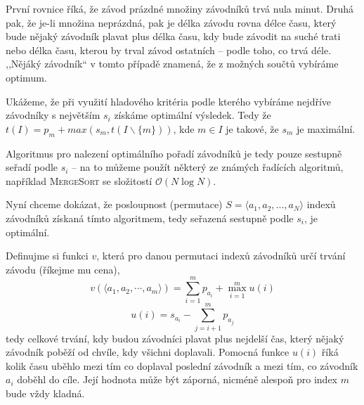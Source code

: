 \documentclass[12pt]{article}
\newcommand{\la}{\leftarrow}
\renewcommand{\O}{\mathcal{O}}
\begin{document}
První rovnice říká, že závod prázdné množiny závodníků trvá nula minut. Druhá pak, že je-li množina
neprázdná, pak je délka závodu rovna délce času, který bude nějaký závodník plavat plus délka času,
kdy bude závodit na suché trati nebo délka času, kterou by trval závod ostatních -- podle
toho, co trvá déle. ,,Nějáký závodník`` v tomto případě znamená, že z možných součtů vybíráme
optimum.

Ukážeme, že při využití hladového kritéria podle kterého vybíráme nejdříve závodníky s největším
$s_i$ získáme optimální výsledek. Tedy že $t(I) = p_m + max(s_m, t(I \smallsetminus \{m\}))$, kde $m
\in I$ je takové, že $s_m$ je maximální.

Algoritmus pro nalezení optimálního pořadí závodníků je tedy pouze sestupně seřadí podle $s_i$ -- na
to můžeme použít některý ze známých řadících algoritmů, například \textsc{MergeSort} se složitostí
$\O(N\log N)$.

%
%

\bigskip

\noindent
Nyní chceme dokázat, že posloupnost (permutace) $S = \langle a_1,a_2,...,a_N \rangle$ indexů
závodníků získaná tímto algoritmem, tedy seřazená sestupně podle $s_i$, je optimální.

Definujme si funkci $v$, která pro danou permutaci indexů závodníků určí trvání závodu (říkejme mu cena),
$$ v(\langle a_1,a_2,\cdots,a_m \rangle) = \sum_{i=1}^m p_{a_i} + \max_{i=1}^m u(i)$$
$$ u(i) = s_{a_i} - \sum_{j=i+1}^m p_{a_j}$$
tedy celkové trvání, kdy budou závodníci plavat plus nejdelší čas, který nějaký závodník poběží od
chvíle, kdy všichni doplavali. Pomocná funkce $u(i)$ říká kolik času uběhlo mezi tím co doplaval
poslední závodník a mezi tím, co závodník $a_i$ doběhl do cíle. Její hodnota může být záporná,
nicméně alespoň pro index $m$ bude vždy kladná.
\end{document}
